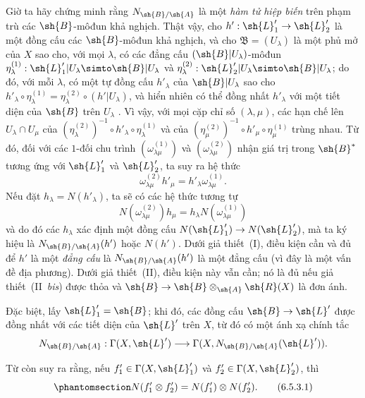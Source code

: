 \documentclass[oneside,10pt]{amsart}
\makeatletter
\newcommand{\ega@arrow}[2]{\mathchoice{#1}{#2}{#2}{#2}}
\renewcommand{\to}{\ega@arrow{\longrightarrow}{\rightarrow}}
\newcommand{\oldpage}[2][]{\marginnote{\normalfont\footnotesize\textbf{#1}~|~#2}\ignorespaces}
\let\EGAOriginalLabel\label
\renewcommand{\label}[1]{\phantomsection\EGAOriginalLabel{#1}}
\makeatother
\begin{document}
\begin{env}[6.5.3]
\label{II.6.5.3}
Giờ ta hãy chứng minh rằng $N_{\sh{B}/\sh{A}}$ là một \emph{hàm tử hiệp biến} trên phạm trù các $\sh{B}$-môđun khả nghịch.
Thật vậy, cho $h':\sh{L}'_1\to\sh{L}'_2$ là một đồng cấu các $\sh{B}$-môđun khả nghịch, và cho $\mathfrak{B}=(U_\lambda)$ là một phủ mở của $X$ sao cho, với mọi $\lambda$, có các đẳng cấu $(\sh{B}|U_\lambda)$-môđun $\eta_\lambda^{(1)}:\sh{L}'_1|U_\lambda\simto\sh{B}|U_\lambda$ và $\eta_\lambda^{(2)}:\sh{L}'_2|U_\lambda\simto\sh{B}|U_\lambda$;
do đó, với mỗi $\lambda$, có một tự đồng cấu $h'_\lambda$ của $\sh{B}|U_\lambda$ sao cho $h'_\lambda\circ\eta_\lambda^{(1)}=\eta_\lambda^{(2)}\circ(h'|U_\lambda)$, và hiển nhiên có thể đồng nhất $h'_\lambda$ với một tiết diện của $\sh{B}$ trên $U_\lambda$ .
Vì vậy, với mọi cặp chỉ số $(\lambda,\mu)$, các hạn chế lên $U_\lambda\cap U_\mu$ của $(\eta_\lambda^{(2)})^{-1}\circ h'_\lambda\circ\eta_\lambda^{(1)}$ và của $(\eta_\mu^{(2)})^{-1}\circ h'_\mu\circ\eta_\mu^{(1)}$ trùng nhau.
Từ đó, đối với các $1$-đối chu trình $(\omega_{\lambda\mu}^{(1)})$ và $(\omega_{\lambda\mu}^{(2)})$ nhận giá trị trong $\sh{B}^*$ tương ứng với $\sh{L}'_1$ và $\sh{L}'_2$, ta suy ra hệ thức
\[
  \omega_{\lambda\mu}^{(2)}h'_\mu = h'_\lambda\omega_{\lambda\mu}^{(1)}.
\]
\oldpage[II]{128}
Nếu đặt $h_\lambda=N(h'_\lambda)$, ta sẽ có các hệ thức tương tự
\[
  N(\omega_{\lambda\mu}^{(2)})h_\mu = h_\lambda N(\omega_{\lambda\mu}^{(1)})
\]
và do đó các $h_\lambda$ xác định một đồng cấu $N(\sh{L}'_1)\to N(\sh{L}'_2)$, mà ta ký hiệu là $N_{\sh{B}/\sh{A}}(h')$ hoặc $N(h')$.
Dưới giả thiết~(I), điều kiện cần và đủ để $h'$ là một \emph{đẳng cấu} là $N_{\sh{B}/\sh{A}}(h')$ là một đẳng cấu (vì đây là một vấn đề địa phương).
Dưới giả thiết~(II), điều kiện này vẫn cần;
nó là đủ nếu giả thiết~(II~\emph{bis}) được thỏa và $\sh{B}\to\sh{B}\otimes_{\sh{A}}\sh{R}(X)$ là đơn ánh.

Đặc biệt, lấy $\sh{L}'_1=\sh{B}$;
khi đó, các đồng cấu $\sh{B}\to\sh{L}'$ được đồng nhất  với các tiết diện của $\sh{L}'$ trên $X$, từ đó có một ánh xạ chính tắc
\[
  N_{\sh{B}/\sh{A}} : \Gamma(X,\sh{L}')\to\Gamma(X,N_{\sh{B}/\sh{A}}(\sh{L}')).
\]

Từ  còn suy ra rằng, nếu $f'_1\in\Gamma(X,\sh{L}'_1)$ và $f'_2\in\Gamma(X,\sh{L}'_2)$, thì
\[
\label{II.6.5.3.1}
  N(f'_1\otimes f'_2) = N(f'_1)\otimes N(f'_2).
\tag{6.5.3.1}
\]


\end{env}
\end{document}
